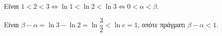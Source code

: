 \begin{alist}
\item Είναι $1 < 2 < 3 \Leftrightarrow \ln 1 < \ln 2 < \ln 3 \Leftrightarrow 0 < \alpha < \beta$.
\item Είναι $\beta - \alpha = \ln 3 - \ln 2 = \ln\dfrac{3}{2} < \ln e = 1$, οπότε πράγματι $\beta - \alpha < 1$.
\end{alist}

